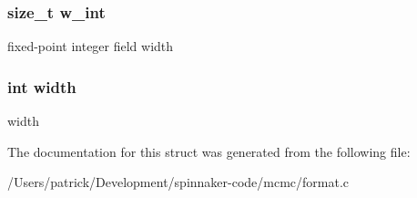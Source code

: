 \subsubsection[{\texorpdfstring{w\+\_\+int}{w_int}}]{\setlength{\rightskip}{0pt plus 5cm}size\+\_\+t w\+\_\+int}\hypertarget{struct_t___format_spec_ae9d4dc1734b1121e33002ba09d8a3300}{}\label{struct_t___format_spec_ae9d4dc1734b1121e33002ba09d8a3300}
fixed-\/point integer field width 
\subsubsection[{\texorpdfstring{width}{width}}]{\setlength{\rightskip}{0pt plus 5cm}int width}\hypertarget{struct_t___format_spec_a2474a5474cbff19523a51eb1de01cda4}{}\label{struct_t___format_spec_a2474a5474cbff19523a51eb1de01cda4}
width 

The documentation for this struct was generated from the following file\+:\begin{DoxyCompactItemize}
\item 
/\+Users/patrick/\+Development/spinnaker-\/code/mcmc/format.\+c\end{DoxyCompactItemize}
